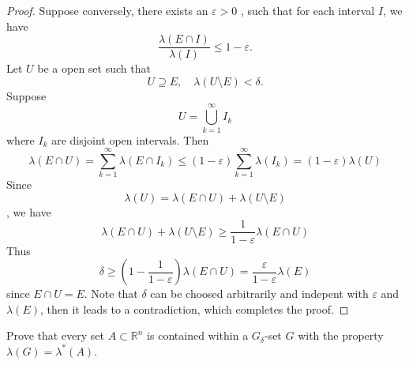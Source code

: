 \documentclass[../main.tex]{subfiles}
\begin{document}
\begin{proof}
     Suppose conversely, there exists an \(   \varepsilon > 0  \) , such that for each interval \(  I  \), we have \[
     \frac{ \lambda \left( E\cap I \right)  }{ \lambda \left( I \right)  }\le 1- \varepsilon .  
     \]  Let \(  U   \) be a open set such that \[
     U\supseteq E,\quad  \lambda \left( U\setminus E \right)<  \delta  .
     \] Suppose \[
     U=  \bigcup _{k = 1}^{\infty} I _{k}
     \] where \(  I _{k}  \) are disjoint open intervals. Then \[
      \lambda \left( E\cap U \right) = \sum _{k = 1}^{\infty}  \lambda \left( E\cap I _{k} \right) \le  \left( 1- \varepsilon  \right) \sum _{k = 1} ^{\infty}\lambda \left( I _{k} \right) = \left( 1- \varepsilon  \right) \lambda \left( U \right)    
     \]  Since \[
       \lambda \left( U \right)=  \lambda \left( E\cap U \right)+  \lambda \left( U\setminus E \right)   
     \], we have \[
      \lambda \left( E\cap U \right)+  \lambda \left( U\setminus E \right) \ge  \frac{1 }{1- \varepsilon  } \lambda \left( E\cap U \right)    
     \] Thus \[
      \delta \ge \left( 1-\frac{1 }{1- \varepsilon  }  \right) \lambda \left( E\cap U \right)  = \frac{ \varepsilon  }{1- \varepsilon  } \lambda \left( E \right)  
     \] since \(  E\cap U= E  \).  Note that \(   \delta   \) can be choosed arbitrarily and indepent with \(   \varepsilon   \) and \(   \lambda \left( E \right)   \), then it leads to a contradiction, which completes the proof.  
\end{proof}
 \begin{exercise}{}{}
    Prove that every set $A \subset \mathbb{R}^n$ is contained within a $G_{\delta}$-set $G$ with the property $\lambda(G) = \lambda^*(A)$.
 \end{exercise}
\end{document}
